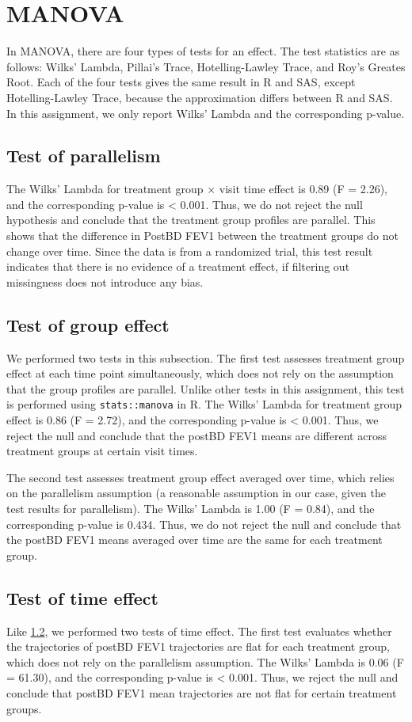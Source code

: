 \documentclass[12pt]{article}
\begin{document}
\section{MANOVA}
In MANOVA, there are four types of tests for an effect.
The test statistics are as follows:
Wilks' Lambda, Pillai's Trace, Hotelling-Lawley Trace, and Roy's Greates Root.
Each of the four tests gives the same result in R and SAS, except Hotelling-Lawley Trace,
because the approximation differs between R and SAS.
In this assignment, we only report 
Wilks' Lambda and the corresponding p-value.


\subsection{Test of parallelism}
The Wilks' Lambda for 
treatment group $\times$ visit time effect is 0.89 (F = 2.26),
and the corresponding p-value is < 0.001. Thus, we do not reject the null hypothesis
and conclude that the treatment group profiles are parallel.
This shows that the difference in PostBD FEV1 between the treatment groups
do not change over time. Since the data is from a randomized trial,
this test result indicates that there is no evidence of a treatment effect,
if filtering out missingness does not introduce any bias.

\subsection{Test of group effect}\label{subsec:test-group}
We performed two tests in this subsection.
The first test assesses treatment group effect at each time point
simultaneously, which does not rely on the assumption that
the group profiles are parallel. Unlike other tests in this assignment,
this test is performed using
\verb|stats::manova| in R. The Wilks' Lambda for treatment group effect
is 0.86 (F = 2.72), and the corresponding p-value is < 0.001. Thus,
we reject the null and conclude that the postBD FEV1 means
are different across treatment groups at certain visit times.

The second test assesses treatment group effect averaged over time,
which relies on the parallelism assumption (a reasonable assumption
in our case, given the test results for parallelism).
The Wilks' Lambda is 1.00 (F = 0.84), and the corresponding p-value
is 0.434. 
Thus, we do not reject the null and conclude that the
postBD FEV1 means averaged over time
are the same for each treatment group.


\subsection{Test of time effect}
Like \cref{subsec:test-group},
we performed two tests of time effect.
The first test evaluates whether the trajectories
of postBD FEV1 trajectories
are flat for each treatment group, which does not
rely on the parallelism assumption.
The Wilks' Lambda is 0.06 (F = 61.30), and the corresponding p-value
is < 0.001. Thus, we reject the null and conclude that
postBD FEV1 mean trajectories are not flat for certain treatment groups.
\end{document}
